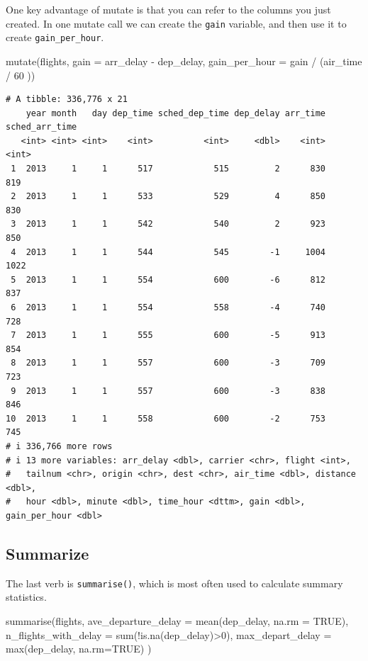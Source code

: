 \documentclass[
  letterpaper,
  DIV=11,
  numbers=noendperiod,
  oneside]{scrreprt}
\newenvironment{Shaded}{\begin{snugshade}}{\end{snugshade}}
\newcommand{\AttributeTok}[1]{\textcolor[rgb]{0.40,0.45,0.13}{#1}}
\newcommand{\ConstantTok}[1]{\textcolor[rgb]{0.56,0.35,0.01}{#1}}
\newcommand{\DecValTok}[1]{\textcolor[rgb]{0.68,0.00,0.00}{#1}}
\newcommand{\FunctionTok}[1]{\textcolor[rgb]{0.28,0.35,0.67}{#1}}
\newcommand{\NormalTok}[1]{\textcolor[rgb]{0.00,0.23,0.31}{#1}}
\newcommand{\SpecialCharTok}[1]{\textcolor[rgb]{0.37,0.37,0.37}{#1}}
\begin{document}
One key advantage of mutate is that you can refer to the columns you
just created. In one mutate call we can create the \texttt{gain}
variable, and then use it to create \texttt{gain\_per\_hour}.

\begin{Shaded}
\begin{Highlighting}[]
\FunctionTok{mutate}\NormalTok{(flights, }\AttributeTok{gain =}\NormalTok{ arr\_delay }\SpecialCharTok{{-}}\NormalTok{ dep\_delay, }
                \AttributeTok{gain\_per\_hour =}\NormalTok{ gain }\SpecialCharTok{/}\NormalTok{ (air\_time }\SpecialCharTok{/} \DecValTok{60}\NormalTok{ ))}
\end{Highlighting}
\end{Shaded}

\begin{verbatim}
# A tibble: 336,776 x 21
    year month   day dep_time sched_dep_time dep_delay arr_time sched_arr_time
   <int> <int> <int>    <int>          <int>     <dbl>    <int>          <int>
 1  2013     1     1      517            515         2      830            819
 2  2013     1     1      533            529         4      850            830
 3  2013     1     1      542            540         2      923            850
 4  2013     1     1      544            545        -1     1004           1022
 5  2013     1     1      554            600        -6      812            837
 6  2013     1     1      554            558        -4      740            728
 7  2013     1     1      555            600        -5      913            854
 8  2013     1     1      557            600        -3      709            723
 9  2013     1     1      557            600        -3      838            846
10  2013     1     1      558            600        -2      753            745
# i 336,766 more rows
# i 13 more variables: arr_delay <dbl>, carrier <chr>, flight <int>,
#   tailnum <chr>, origin <chr>, dest <chr>, air_time <dbl>, distance <dbl>,
#   hour <dbl>, minute <dbl>, time_hour <dttm>, gain <dbl>, gain_per_hour <dbl>
\end{verbatim}

\subsection{Summarize}\label{summarize}

The last verb is \texttt{summarise()}, which is most often used to
calculate summary statistics.

\begin{Shaded}
\begin{Highlighting}[]
\FunctionTok{summarise}\NormalTok{(flights, }
          \AttributeTok{ave\_departure\_delay =} \FunctionTok{mean}\NormalTok{(dep\_delay, }\AttributeTok{na.rm =} \ConstantTok{TRUE}\NormalTok{), }
          \AttributeTok{n\_flights\_with\_delay =} \FunctionTok{sum}\NormalTok{(}\SpecialCharTok{!}\FunctionTok{is.na}\NormalTok{(dep\_delay)}\SpecialCharTok{\textgreater{}}\DecValTok{0}\NormalTok{), }
          \AttributeTok{max\_depart\_delay =} \FunctionTok{max}\NormalTok{(dep\_delay, }\AttributeTok{na.rm=}\ConstantTok{TRUE}\NormalTok{)}
\NormalTok{)}
\end{Highlighting}
\end{Shaded}
\end{document}
